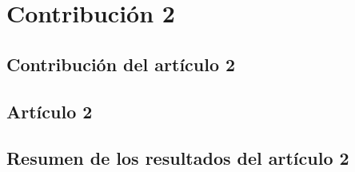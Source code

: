 \chapter{Contribución 2}
\label{cha:contribucion-2}

\section{Contribución del artículo 2}
\label{sec:contribucion-articulo-2}

\section{Artículo 2}
\label{sec:articulo-2}

\section{Resumen de los resultados del artículo 2}
\label{sec:resumen-resultados-articulo-2}